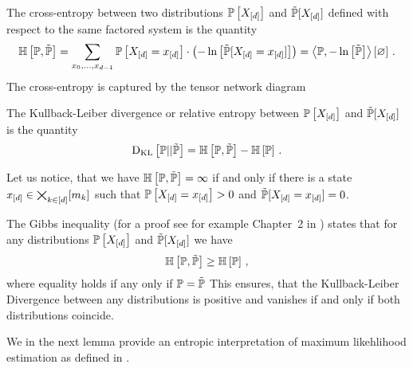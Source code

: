 \begin{definition}
    \label{def:crossEntropy}
    The cross-entropy between two distributions $\mathbb{P}\left[X_{[d]}\right]$ and $\tilde{\mathbb{P}}[X_{[d]}]$ defined with respect to the same factored system is the quantity
    \begin{align*}
        \mathbb{H}\left[\mathbb{P},\tilde{\mathbb{P}}\right]
        = \sum_{x_{0},\ldots,x_{d-1}}  \mathbb{P}\left[X_{[d]}=x_{[d]}\right] \cdot \left(-\ln \left[ \tilde{\mathbb{P}}[X_{[d]}=x_{[d]}] \right]\right)
        = \left\langle \mathbb{P},-\ln \left[ \tilde{\mathbb{P}} \right]\right\rangle \left[ \varnothing \right] \, .
    \end{align*}
    The cross-entropy is captured by the tensor network diagram
    \begin{center}
        
    \end{center}
    The Kullback-Leiber divergence or relative entropy between $\mathbb{P}\left[X_{[d]}\right]$ and $\tilde{\mathbb{P}}[X_{[d]}]$ is the quantity
    \begin{align*}
        \mathrm{D}_{\mathrm{KL}}\left[ \mathbb{P} || \tilde{\mathbb{P}} \right] = \mathbb{H}\left[\mathbb{P},\tilde{\mathbb{P}}\right] - \mathbb{H}\left[\mathbb{P}\right]  \, .
    \end{align*}
\end{definition}

Let us notice, that we have $\mathbb{H}\left[\mathbb{P},\tilde{\mathbb{P}}\right] = \infty$ if and only if there is a state $x_{[d]}\in\bigtimes_{k\in[d]}[m_{k}]$ such that $\mathbb{P}\left[X_{[d]}=x_{[d]}\right]>0$ and $\tilde{\mathbb{P}}[X_{[d]}=x_{[d]}]=0$.

The Gibbs inequality (for a proof see for example Chapter~2 in \cite{cover_elements_2006}) states that for any distributions $\mathbb{P}\left[X_{[d]}\right]$ and $\tilde{\mathbb{P}}[X_{[d]}]$ we have
\begin{align*}
    \mathbb{H}\left[\mathbb{P},\tilde{\mathbb{P}}\right] \geq \mathbb{H}\left[\mathbb{P}\right] \, ,
\end{align*}
where equality holds if any only if $\mathbb{P}=\tilde{\mathbb{P}}$
This ensures, that the Kullback-Leiber Divergence between any distributions is positive and vanishes if and only if both distributions coincide.

We in the next lemma provide an entropic interpretation of maximum likehlihood estimation as defined in .

